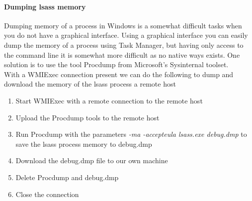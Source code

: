 \documentclass{article}
\begin{document}
\paragraph{Dumping \gls{lsass} memory}
Dumping memory of a process in Windows is a somewhat difficult tasks when you do not have a graphical interface. Using a graphical interface you can easily dump the memory of a process using Task Manager\cite{url:microsoft:dump-memory-task-manager}, but having only access to the command line it is somewhat more difficult as no native ways exists. One solution is to use the tool Procdump from Microsoft's Sysinternal toolset.\\
With a WMIExec connection present we can do the following to dump and download the memory of the \gls{lsass} process a remote host
\begin{enumerate}
    \item Start WMIExec with a remote connection to the remote host
    \item Upload the Procdump tools to the remote host
    \item Run Procdump with the parameters \emph{-ma -accepteula lsass.exe debug.dmp} to save the \gls{lsass} process memory to debug.dmp
    \item Download the debug.dmp file to our own machine
    \item Delete Procdump and debug.dmp
    \item Close the connection
\end{enumerate}
\end{document}

